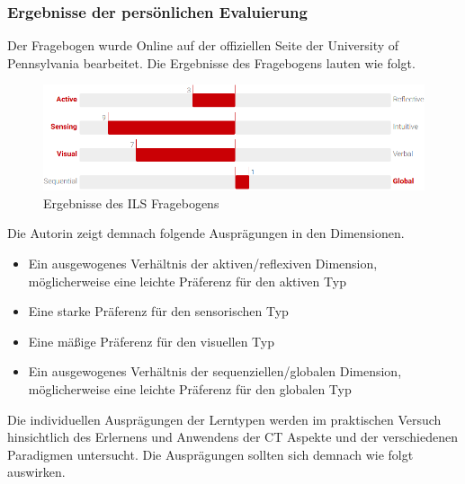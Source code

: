 \subsubsection{Ergebnisse der persönlichen Evaluierung}
Der Fragebogen wurde Online auf der offiziellen Seite der University of Pennsylvania bearbeitet. Die Ergebnisse des Fragebogens lauten wie folgt.

\begin{figure}[H]
    \centering
    \includegraphics[width=1\linewidth]{Figures/Section_4/ILS_result}
    \caption{Ergebnisse des ILS Fragebogens}
\end{figure}

Die Autorin zeigt demnach folgende Ausprägungen in den Dimensionen.

\begin{itemize}
    \item Ein ausgewogenes Verhältnis der aktiven/reflexiven Dimension, möglicherweise eine leichte Präferenz für den aktiven Typ
    \item Eine starke Präferenz für den sensorischen Typ
    \item Eine mäßige Präferenz für den visuellen Typ
    \item Ein ausgewogenes Verhältnis der sequenziellen/globalen Dimension, möglicherweise eine leichte Präferenz für den globalen Typ
\end{itemize}

Die individuellen Ausprägungen der Lerntypen werden im praktischen Versuch hinsichtlich des Erlernens und Anwendens der CT Aspekte und der verschiedenen Paradigmen untersucht.
Die Ausprägungen sollten sich demnach wie folgt auswirken.

